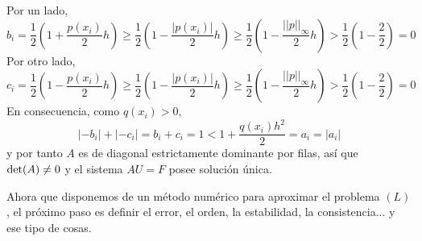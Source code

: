 \documentclass[11pt]{report}
\makeatletter
\renewenvironment{proof}[1][\proofname]{\par
  \pushQED{\qed}%
  \normalfont \topsep\z@skip %
  \trivlist
  \item[\hskip\labelsep
        \itshape
    #1\@addpunct{.}]\ignorespaces
}{%
  \popQED\endtrivlist\@endpefalse
}
\theoremstyle{mytheorem}
\theoremstyle{mydefinition}
\theoremstyle{myexample}
\let\oldproofname=\proofname
\renewcommand{\proofname}{\rm\bf{\oldproofname}}}
\makeatother
\begin{document}
\begin{proof}
    Por un lado,
    \[b_i = \frac{1}{2}\left(1+\frac{p(x_i)}{2}h \right) \geq \frac{1}{2}\left(1-\frac{|p(x_i)|}{2}h\right) \geq \frac{1}{2}\left(1-\frac{||p||_{\infty}}{2}h\right) > \frac{1}{2}\left(1-\frac{2}{2}\right) = 0\]
    Por otro lado,
    \[c_i = \frac{1}{2}\left( 1-\frac{p(x_i)}{2}h\right) \geq \frac{1}{2}\left(1-\frac{|p(x_i)|}{2}h\right) \geq \frac{1}{2}\left(1-\frac{||p||_{\infty}}{2}h\right) > \frac{1}{2}\left(1-\frac{2}{2}\right) = 0\]
    En consecuencia, como $q(x_i) > 0$,
    \[|-b_i|+|-c_i| = b_i+c_i = 1 < 1+\frac{q(x_i)h^2}{2} = a_i = |a_i|\]
    y por tanto $A$ es de diagonal estrictamente dominante por filas, así que $\textup{det}(A) \neq 0$ y el sistema $AU=F$ posee solución única.
\end{proof}

Ahora que disponemos de un método numérico para aproximar el problema $(L)$, el próximo paso es definir el error, el orden, la estabilidad, la consistencia... y ese tipo de cosas.
\end{document}
